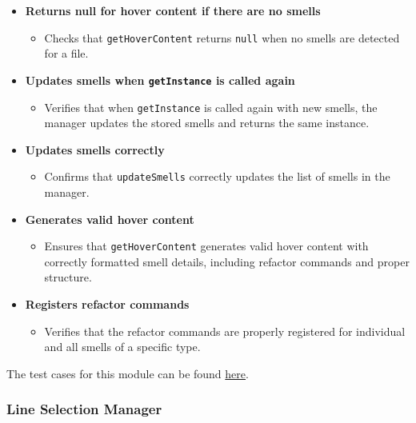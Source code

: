 \documentclass[12pt, titlepage]{article}
\begin{document}
\begin{enumerate}[label={\bf \textcolor{Maroon}{test-SRT-\arabic*}}, wide=0pt, font=\itshape]
\begin{itemize}
    \item \textbf{Returns null for hover content if there are no smells}
    \begin{itemize}
        \item Checks that \texttt{getHoverContent} returns \texttt{null} when no smells are detected for a file.
    \end{itemize}

    \item \textbf{Updates smells when \texttt{getInstance} is called again}
    \begin{itemize}
        \item Verifies that when \texttt{getInstance} is called again with new smells, the manager updates the stored smells and returns the same instance.
    \end{itemize}

    \item \textbf{Updates smells correctly}
    \begin{itemize}
        \item Confirms that \texttt{updateSmells} correctly updates the list of smells in the manager.
    \end{itemize}

    \item \textbf{Generates valid hover content}
    \begin{itemize}
        \item Ensures that \texttt{getHoverContent} generates valid hover content with correctly formatted smell details, including refactor commands and proper structure.
    \end{itemize}

    \item \textbf{Registers refactor commands}
    \begin{itemize}
        \item Verifies that the refactor commands are properly registered for individual and all smells of a specific type.
    \end{itemize}
\end{itemize}

\noindent The test cases for this module can be found \href{https://github.com/ssm-lab/capstone--sco-vs-code-plugin/blob/plugin-multi-file/test/ui/hoverManager.test.ts}{here}.

\subsubsection{Line Selection Manager}


\end{enumerate}
\end{document}

